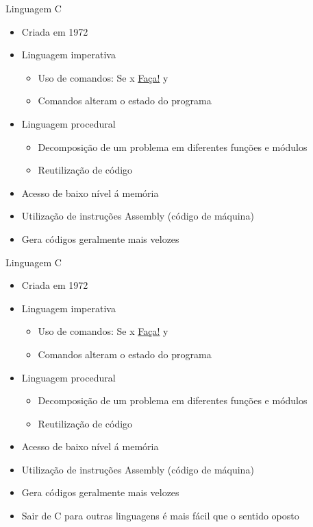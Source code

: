 \documentclass[t, aspectratio=169]{beamer}
\begin{document}
\begin{frame}[label={sec:orgdc781ea}]{Linguagem C}
\begin{itemize}
\item Criada em 1972

\item Linguagem imperativa
\begin{itemize}
\item Uso de comandos: Se \alert{x} \uline{Faça!} \alert{y}
\item Comandos alteram o estado do programa
\end{itemize}

\item Linguagem procedural
\begin{itemize}
\item Decomposição de um problema em diferentes funções e módulos
\item Reutilização de código
\end{itemize}

\item Acesso de baixo nível á memória
\item Utilização de instruções Assembly (código de máquina)
\item Gera códigos geralmente mais velozes
\end{itemize}
\end{frame}

\begin{frame}[label={sec:org45d876b}]{Linguagem C}
\begin{itemize}
\item Criada em 1972

\item Linguagem imperativa
\begin{itemize}
\item Uso de comandos: Se \alert{x} \uline{Faça!} \alert{y}
\item Comandos alteram o estado do programa
\end{itemize}

\item Linguagem procedural
\begin{itemize}
\item Decomposição de um problema em diferentes funções e módulos
\item Reutilização de código
\end{itemize}

\item Acesso de baixo nível á memória
\item Utilização de instruções Assembly (código de máquina)
\item Gera códigos geralmente mais velozes

\item Sair de C para outras linguagens é mais fácil que o sentido oposto
\end{itemize}
\end{frame}
\end{document}
